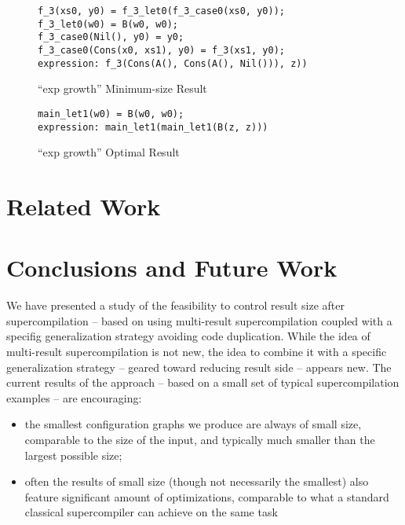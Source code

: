 \documentclass[submission,copyright,creativecommons]{eptcs}
\begin{document}
\begin{figure}
\begin{lstlisting}
f_3(xs0, y0) = f_3_let0(f_3_case0(xs0, y0));
f_3_let0(w0) = B(w0, w0);
f_3_case0(Nil(), y0) = y0;
f_3_case0(Cons(x0, xs1), y0) = f_3(xs1, y0);
expression: f_3(Cons(A(), Cons(A(), Nil())), z))
\end{lstlisting}
\caption{``exp growth'' Minimum-size Result}
\label{fig:ExpGrowthMinResult}
\end{figure}

\begin{figure}
\begin{lstlisting}
main_let1(w0) = B(w0, w0);
expression: main_let1(main_let1(B(z, z)))
\end{lstlisting}
\caption{``exp growth'' Optimal Result}
\label{fig:ExpGrowthOptResult}
\end{figure}

\section{Related Work}

\section{Conclusions and Future Work}

We have presented a study of the feasibility to control result size after supercompilation
-- based on using multi-result supercompilation coupled with a specifig generalization
strategy avoiding code duplication.
While the idea of multi-result supercompilation is not new, the idea to combine it
with a specific generalization strategy -- geared toward reducing result side --
appears new.
The current results of the approach -- based on a small set of typical supercompilation examples --
are encouraging:
\begin{itemize}
  \item the smallest configuration graphs we produce are always of small size, comparable
    to the size of the input, and typically much smaller than the largest possible size;
  \item often the results of small size (though not necessarily the smallest) also feature 
    significant amount of optimizations, comparable to what a standard classical supercompiler
    can achieve on the same task
\end{itemize}
\end{document}
